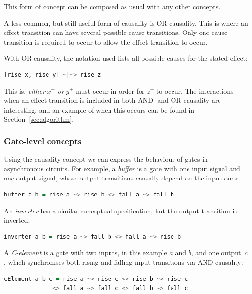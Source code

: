 \documentclass[british,conference,compsoc]{IEEEtran}
\begin{document}
This form of concept can be composed as usual with any other concepts.

A less common, but still useful form of causality is OR-causality. This is 
where an effect transition can have several possible cause transitions. Only 
one cause transition is required to occur to allow the effect transition to 
occur. 

With OR-causality, the notation used lists all possible causes for the stated 
effect:

\begin{lstlisting}[language=haskell]
            [rise x, rise y] ~|~> rise z
\end{lstlisting}

This is, \emph{either} $x^{+}$ \emph{or} $y^{+}$ must occur in order for 
$z^{+}$ to occur. The interactions when an effect transition is included in both AND- and 
OR-causality are interesting, and an example of when this occurs can be found 
in Section~\ref{sec:algorithm}.

\vspace{-2mm}

\subsubsection{Gate-level concepts} Using the causality concept we can express
the behaviour of gates in asynchronous circuits. For example, a \emph{buffer}
is a gate with one input signal and one output signal,
whose output transitions causally depend on the input ones:

\begin{lstlisting}[language=haskell]
buffer a b = rise a ~> rise b <> fall a ~> fall b
\end{lstlisting}

\noindent An \emph{inverter} has a similar conceptual specification, but the
output transition is inverted:

\begin{lstlisting}[language=haskell]
inverter a b = rise a ~> fall b <> fall a ~> rise b
\end{lstlisting}

\noindent A \emph{C-element} is a gate with two inputs, in this example $a$ and $b$, and one
output~$c$, which synchronises both rising and falling input transitions
via AND-causality:

\begin{lstlisting}[language=haskell]
cElement a b c = rise a ~> rise c <> rise b ~> rise c
              <> fall a ~> fall c <> fall b ~> fall c
\end{lstlisting}
\end{document}
